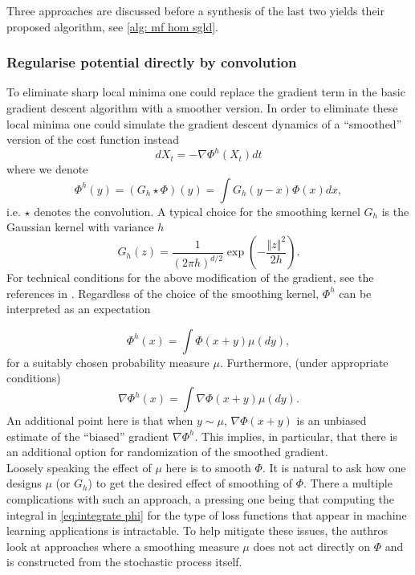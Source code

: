 \documentclass{article}
\begin{document}
Three approaches are discussed before a synthesis of the last two yields their proposed algorithm, see \ref{alg: mf hom sgld}.



\subsubsection{Regularise potential directly by convolution}\label{sec:direct smoothing}

To eliminate sharp local minima one could replace the gradient term
in the basic gradient descent algorithm with a smoother version. In order to
eliminate these local minima one could simulate the gradient descent
dynamics of a ``smoothed'' version of the cost function instead
\begin{equation}
dX_{t}=-\nabla\Phi^{h}(X_{t})dt\label{eq:ode_h}
\end{equation}
where we denote 
\begin{equation}
\Phi^{h}\left(y\right)=(G_{h}\star\Phi)(y)=\int G_{h}(y-x)\Phi(x)dx,\label{eq:integrate phi}
\end{equation}
i.e. $\star$ denotes the convolution. A typical choice for the smoothing
kernel $G_{h}$ is the Gaussian kernel with variance $h$ 
\[
G_{h}(z)=\frac{1}{\left(2\pi h\right)^{d/2}}\exp\left(-\frac{\left\Vert z\right\Vert ^{2}}{2h}\right).
\]
For technical conditions for the above modification of the gradient, see the references in \cite{kantas2019sharpflatshallowweakly}. Regardless
of the choice of the smoothing kernel, $\Phi^{h}$ can be interpreted
as an expectation 

\[
\Phi^{h}\left(x\right)=\int\Phi(x+y)\mu(dy),
\]
for a suitably chosen probability measure $\mu$. Furthermore, (under
appropriate conditions) 
\begin{equation}
\nabla\Phi^{h}\left(x\right)=\int\nabla\Phi(x+y)\mu(dy).\label{eq:smooth_grad}
\end{equation}
An additional point here is that when $y\sim\mu$, $\nabla\Phi(x+y)$
is an unbiased estimate of the ``biased'' gradient $\nabla\Phi^{h}$.
This implies, in particular, that there is an additional option for
randomization of the smoothed gradient.\\ 

Loosely speaking the effect of $\mu$ here is to smooth $\Phi$.
It is natural to ask how one designs $\mu$ (or $G_{h}$)
to get the desired effect of smoothing of $\Phi$. There a multiple complications with such an approach, a pressing one being that computing the integral in \ref{eq:integrate phi}
for the type of loss functions that appear in machine learning applications
is intractable. To help mitigate these issues, the authros look at approaches where a smoothing measure $\mu$ does not act directly on $\Phi$ and is constructed from the stochastic process itself.
\end{document}
